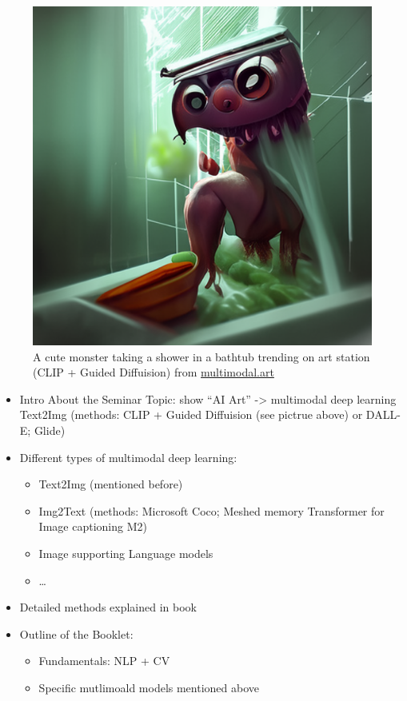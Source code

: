 \documentclass[
]{krantz}
\providecommand{\tightlist}{%
  \setlength{\itemsep}{0pt}\setlength{\parskip}{0pt}}
\begin{document}
\begin{figure}
\centering
\includegraphics{./figures/00-chapter0/AI_art.png}
\caption{A cute monster taking a shower in a bathtub trending on art station (CLIP + Guided Diffuision) from \href{https://multimodal.art/}{multimodal.art}}
\end{figure}

\begin{itemize}
\tightlist
\item
  Intro About the Seminar Topic: show ``AI Art'' -\textgreater{} multimodal deep learning Text2Img (methods: CLIP + Guided Diffuision (see pictrue above) or DALL-E; Glide)\\
\item
  Different types of multimodal deep learning:

  \begin{itemize}
  \tightlist
  \item
    Text2Img (mentioned before)\\
  \item
    Img2Text (methods: Microsoft Coco; Meshed memory Transformer for Image captioning M2)\\
  \item
    Image supporting Language models\\
  \item
    \ldots{}
  \end{itemize}
\item
  Detailed methods explained in book\\
\item
  Outline of the Booklet:

  \begin{itemize}
  \tightlist
  \item
    Fundamentals: NLP + CV\\
  \item
    Specific mutlimoald models mentioned above
  \end{itemize}
\end{itemize}
\end{document}
